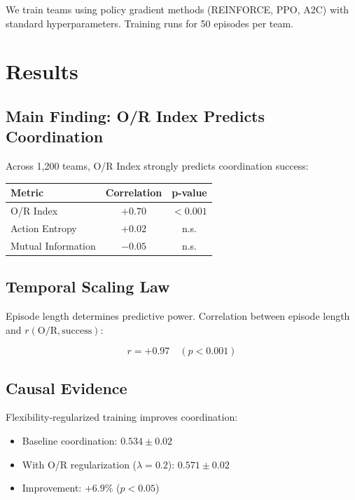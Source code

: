 \documentclass[twoside]{article}
\newcommand{\ORIndex}{O/R Index}
\begin{document}
We train teams using policy gradient methods (REINFORCE, PPO, A2C) with standard hyperparameters. Training runs for 50 episodes per team.

\section{Results}

\subsection{Main Finding: O/R Index Predicts Coordination}

Across 1,200 teams, \ORIndex{} strongly predicts coordination success:

\begin{center}
\begin{tabular}{lcc}
\toprule
\textbf{Metric} & \textbf{Correlation} & \textbf{p-value} \\
\midrule
\ORIndex{} & $+0.70$ & $< 0.001$ \\
Action Entropy & $+0.02$ & n.s. \\
Mutual Information & $-0.05$ & n.s. \\
\bottomrule
\end{tabular}
\end{center}

\subsection{Temporal Scaling Law}

Episode length determines predictive power. Correlation between episode length and $r(\text{O/R}, \text{success})$:

\begin{equation}
r = +0.97 \quad (p < 0.001)
\end{equation}

\subsection{Causal Evidence}

Flexibility-regularized training improves coordination:

\begin{itemize}
    \item Baseline coordination: $0.534 \pm 0.02$
    \item With O/R regularization ($\lambda = 0.2$): $0.571 \pm 0.02$
    \item Improvement: $+6.9\%$ ($p < 0.05$)
\end{itemize}
\end{document}
